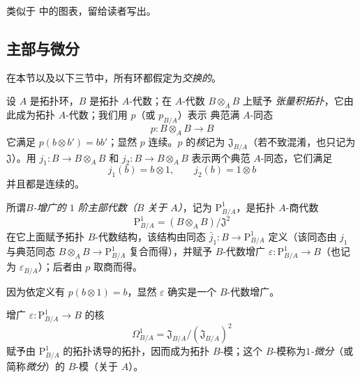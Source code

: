 类似于  中的图表，留给读者写出。

\subsection{主部与微分}
\label{subsection:0.20.4-fr}

在本节以及以下三节中，所有环都假定为\emph{交换的}。

\begin{env}[20.4.1]
\label{0.20.4.1-fr}
设 $A$ 是拓扑环，$B$ 是拓扑 $A$-代数；在 $A$-代数 $B\otimes_A B$ 上赋予
\emph{张量积拓扑}，它由此成为拓扑 $A$-代数；我们用 $p$（或 $p_{B/A}$）表示
典范满 $A$-同态
\begin{equation}
\tag{20.4.1.1}
\label{0.20.4.1.1-fr}
  p:B\otimes_A B\to B
\end{equation}
它满足 $p(b\otimes b')=bb'$；显然 $p$ 连续。$p$ 的\emph{核}记为
$\mathfrak{J}_{B/A}$（若不致混淆，也只记为 $\mathfrak{J}$）。用
$j_1:B\to B\otimes_A B$ 和 $j_2:B\to B\otimes_A B$ 表示两个典范
$A$-同态，它们满足
\[
  j_1(b)=b\otimes1, \qquad j_2(b)=1\otimes b
\]
并且都是连续的。
\end{env}

\begin{definition}[20.4.2]
\label{0.20.4.2-fr}
所谓\emph{$B$-增广的 $1$ 阶主部代数（$B$ 关于 $A$）}，记为
$\mathrm{P}^1_{B/A}$，是拓扑 $A$-商代数
\begin{equation}
\tag{20.4.2.1}
\label{0.20.4.2.1-fr}
  \mathrm{P}^1_{B/A}=(B\otimes_A B)/\mathfrak{J}^2
\end{equation}
在它上面赋予拓扑 $B$-代数结构，该结构由同态
$\bar{j}_1:B\to\mathrm{P}^1_{B/A}$ 定义（该同态由 $j_1$ 与典范同态
$B\otimes_A B\to\mathrm{P}^1_{B/A}$ 复合而得），并赋予 $B$-代数增广
$\varepsilon:\mathrm{P}^1_{B/A}\to B$（也记为 $\varepsilon_{B/A}$）；后者由
$p$ 取商而得。

因为依定义有 $p(b\otimes1)=b$，显然 $\varepsilon$ 确实是一个 $B$-代数增广。
\end{definition}

\begin{definition}[20.4.3]
\label{0.20.4.3-fr}
增广 $\varepsilon:\mathrm{P}^1_{B/A}\to B$ 的核
\begin{equation}
\tag{20.4.3.1}
\label{0.20.4.3.1-fr}
  \Omega^1_{B/A}=\mathfrak{J}_{B/A}/(\mathfrak{J}_{B/A})^2
\end{equation}
赋予由 $\mathrm{P}^1_{B/A}$ 的拓扑诱导的拓扑，因而成为拓扑 $B$-模；这个
$B$-模称为\emph{$1$-微分}（或简称\emph{微分}）的 $B$-模（关于 $A$）。
\end{definition}

